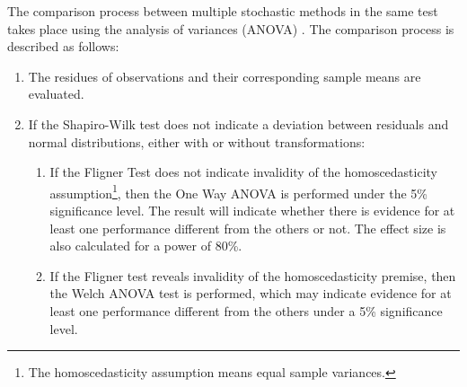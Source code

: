 			The comparison process between multiple stochastic methods in the same test takes place using the analysis of variances (ANOVA) \citep{montgomery2010applied}. The comparison process is described as follows:
			\begin{enumerate}
				\item The residues of observations and their corresponding sample means are evaluated.
				\item If the Shapiro-Wilk test does not indicate a deviation between residuals and normal distributions, either with or without transformations:
				\begin{enumerate}
					\item If the Fligner Test does not indicate invalidity of the homoscedasticity assumption\footnote{The homoscedasticity assumption means equal sample variances.}, then the One Way ANOVA is performed under the 5\% significance level. The result will indicate whether there is evidence for at least one performance different from the others or not. The effect size is also calculated for a power of 80\%.
					\item If the Fligner test reveals invalidity of the homoscedasticity premise, then the Welch ANOVA test is performed, which may indicate evidence for at least one performance different from the others under a 5\% significance level.

\end{enumerate}
\end{enumerate}
